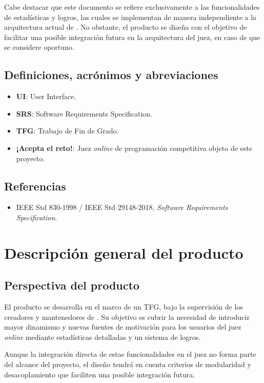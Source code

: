 Cabe destacar que este documento se refiere exclusivamente a las funcionalidades de estadísticas y logros, las cuales se implementan de manera independiente a la arquitectura actual de \aer. No obstante, el producto se diseña con el objetivo de facilitar una posible integración futura en la arquitectura del juez, en caso de que se considere oportuno.

\subsection{Definiciones, acrónimos y abreviaciones}

\begin{itemize}
    \item \textbf{UI}: User Interface.
    \item \textbf{SRS}: Software Requirements Specification.
    \item \textbf{TFG}: Trabajo de Fin de Grado.
    \item \textbf{¡Acepta el reto!}: Juez \textit{online} de programación competitiva objeto de este proyecto.
\end{itemize}

\subsection{Referencias}

\begin{itemize}
    \item IEEE Std 830-1998 / IEEE Std 29148-2018, \textit{Software Requirements Specification}.
\end{itemize}

\section{Descripción general del producto}

\subsection{Perspectiva del producto}

El producto se desarrolla en el marco de un TFG, bajo la supervisión de los creadores y mantenedores de \aer. Su objetivo es cubrir la necesidad de introducir mayor dinamismo y nuevas fuentes de motivación para los usuarios del juez \textit{online} mediante estadísticas detalladas y un sistema de logros.

Aunque la integración directa de estas funcionalidades en el juez no forma parte del alcance del proyecto, el diseño tendrá en cuenta criterios de modularidad y desacoplamiento que faciliten una posible integración futura.

